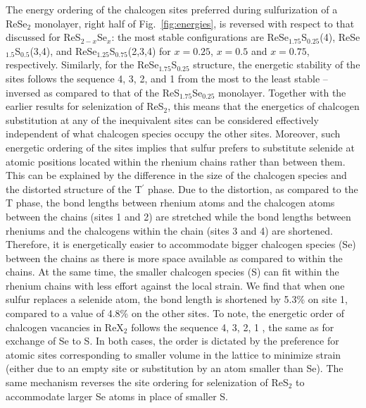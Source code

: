\documentclass[reprint, superscriptaddress, amsmath,amssymb,prb,twocolumn]{revtex4-2}
\def\SSeOne{ReS$_{1.75}$Se$_{0.25}$}
\def\SeSOne{ReSe$_{1.75}$S$_{0.25}$}
\def\SeSTwo{ReSe$_{1.5}$S$_{0.5}$}
\def\SeSThree{ReSe$_{1.25}$S$_{0.75}$}
\newcommand\SOne{1}
\newcommand\STwo{2}
\newcommand\SThree{3}
\newcommand\SFour{4}
\begin{document}
The energy ordering of the chalcogen sites preferred during sulfurization of a ReSe$_{2}$ monolayer, right half of Fig.~\ref{fig:energies}, is reversed with respect to that discussed for ReS$_{2-x}$Se$_{x}$: the most stable configurations are \SeSOne{}(4), \SeSTwo{}(3,4), and \SeSThree{}(2,3,4) for $x=0.25$, $x=0.5$ and $x=0.75$, respectively. Similarly, for the \SeSOne{} structure, the energetic stability of the sites follows the sequence \SFour{}, \SThree{}, \STwo{}, and \SOne{} from the most to the least stable -- inversed as compared to that of the \SSeOne{} monolayer. Together with the earlier results for selenization of ReS$_{2}$, this means that the energetics of chalcogen substitution at any of the inequivalent sites can be considered effectively independent of what chalcogen species occupy the other sites. Moreover, such energetic ordering of the sites implies that sulfur prefers to substitute selenide at atomic positions located within the rhenium chains rather than between them. This can be explained by the difference in the size of the chalcogen species and the distorted structure of the T$^\prime$ phase. Due to the distortion, as compared to the T phase, the bond lengths between rhenium atoms and the chalcogen atoms between the chains (sites 1 and 2) are stretched while the bond lengths between rheniums and the chalcogens within the chain (sites 3 and 4) are shortened. Therefore, it is energetically easier to accommodate bigger chalcogen species (Se) between the chains as there is more space available as compared to within the chains. At the same time, the smaller chalcogen species (S) can fit within the rhenium chains with less effort against the local strain. We find that when one sulfur replaces a selenide atom, the bond length is shortened by 5.3\% on  site 1, compared to a value of 4.8\% on the other sites. To note, the energetic order of chalcogen vacancies in ReX$_{2}$ follows the sequence \SFour{}, \SThree{}, \STwo{}, \SOne{} \cite{horzum_prb_2014, zhu_iscience_2021}, the same as for exchange of Se to S. In both cases, the order is dictated by the preference for atomic sites corresponding to smaller volume in the lattice to minimize strain (either due to an empty site or substitution by an atom smaller than Se). The same mechanism reverses the site ordering for selenization of ReS$_{2}$ to accommodate larger Se atoms in place of smaller S.
\end{document}
